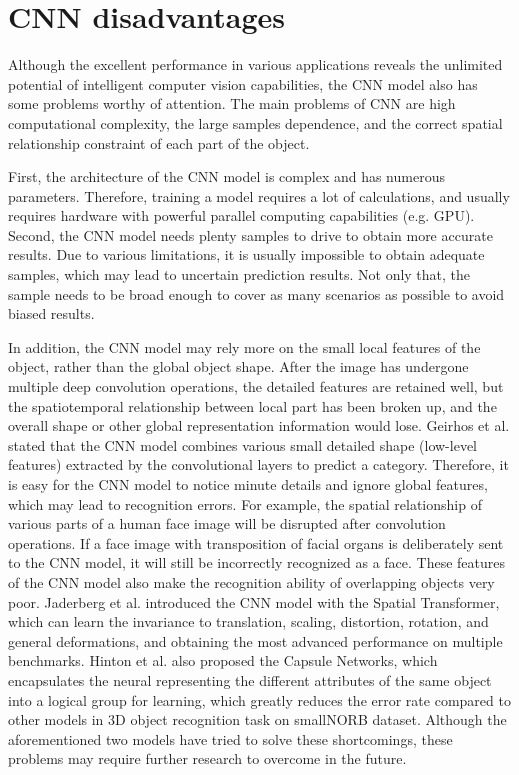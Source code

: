 \documentclass[10pt, a4paper]{IEEEtran} %
\begin{document}
	\section{CNN disadvantages} %
	Although the excellent performance in various applications reveals the unlimited potential of intelligent computer vision capabilities, the CNN model also has some problems worthy of attention. The main problems of CNN are high computational complexity, the large samples dependence, and the correct spatial relationship constraint of each part of the object.
	\par
	First, the architecture of the CNN model is complex and has numerous parameters. Therefore, training a model requires a lot of calculations, and usually requires hardware with powerful parallel computing capabilities (e.g. GPU). Second, the CNN model needs plenty samples to drive to obtain more accurate results. Due to various limitations, it is usually impossible to obtain adequate samples, which may lead to uncertain prediction results. Not only that, the sample needs to be broad enough to cover as many scenarios as possible to avoid biased results.
	\par
	In addition, the CNN model may rely more on the small local features of the object, rather than the global object shape. After the image has undergone multiple deep convolution operations, the detailed features are retained well, but the spatiotemporal relationship between local part has been broken up, and the overall shape or other global representation information would lose. Geirhos et al. \cite{geirhos2018imagenet} stated that the CNN model combines various small detailed shape (low-level features) extracted by the convolutional layers to predict a category. Therefore, it is easy for the CNN model to notice minute details and ignore global features, which may lead to recognition errors. For example, the spatial relationship of various parts of a human face image will be disrupted after convolution operations. If a face image with transposition of facial organs is deliberately sent to the CNN model, it will still be incorrectly recognized as a face. These features of the CNN model also make the recognition ability of overlapping objects very poor. Jaderberg et al. \cite{jaderberg2015spatial} introduced the CNN model with the Spatial Transformer, which can learn the invariance to translation, scaling, distortion, rotation, and general deformations, and obtaining the most advanced performance on multiple benchmarks. Hinton et al. \cite{hinton2018matrix} also proposed the Capsule Networks, which encapsulates the neural representing the different attributes of the same object into a logical group for learning, which greatly reduces the error rate compared to other models in 3D object recognition task on smallNORB \cite{lecun2004learning} dataset. Although the aforementioned two models have tried to solve these shortcomings, these problems may require further research to overcome in the future.
\end{document}

